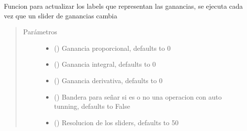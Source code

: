 \documentclass[letterpaper,10pt,spanish]{sphinxmanual}
\begin{document}

\begin{fulllineitems}
\label{\detokenize{codigos/TuningHandler:TuningHandler.update_gain_labels}}
Funcion para actualizar los labels que representan las ganancias, se ejecuta cada vez que un slider de ganancias cambia
\begin{quote}\begin{description}
\item[{Parámetros}] \leavevmode\begin{itemize}
\item {} 
 (\sphinxstyleliteralemphasis{\sphinxupquote{, }}) \textendash{} Ganancia proporcional, defaults to 0

\item {} 
 (\sphinxstyleliteralemphasis{\sphinxupquote{, }}) \textendash{} Ganancia integral, defaults to 0

\item {} 
 (\sphinxstyleliteralemphasis{\sphinxupquote{, }}) \textendash{} Ganancia derivativa, defaults to 0

\item {} 
 (\sphinxstyleliteralemphasis{\sphinxupquote{, }}) \textendash{} Bandera para señar si es o no una operacion con auto tunning, defaults to False

\item {} 
 (\sphinxstyleliteralemphasis{\sphinxupquote{, }}) \textendash{} Resolucion de los sliders, defaults to 50

\end{itemize}

\end{description}\end{quote}

\end{fulllineitems}
\end{document}
